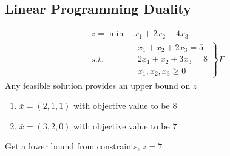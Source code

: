 \documentclass[11pt]{article}
\numberwithin{equation}{section}
\begin{document}
\subsection{Linear Programming Duality}
\begin{example}
    \begin{align*}
        z=\min&\ x_{1}+2 x_{2}+4 x_{3} \\
        s.t.& \ \left.\begin{array}{c}
            x_{1}+x_{2}+2 x_{3}=5 \\
            2 x_{1}+x_{2}+3 x_{3}=8 \\
            x_{1}, x_{2}, x_{3}\geq 0
            \end{array}\right\} F
    \end{align*}
    Any feasible solution provides an upper bound on $z$

    \begin{enumerate}[1)]
        \item $\bar{x}=(2,1,1)$ with objective value to be $8$
        \item $\bar{x}=(3,2,0)$ with objective value to be $7$
    \end{enumerate}
    Get a lower bound from constraints, $z=7$
\end{example}
\end{document}
